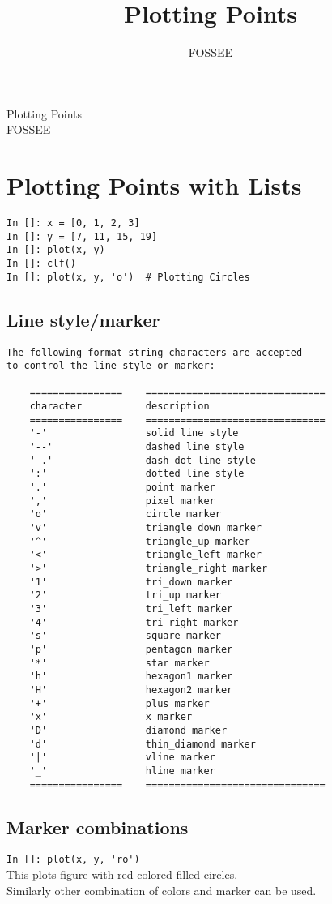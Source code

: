 \documentclass[12pt]{article}
\title{Plotting Points}
\author{FOSSEE}
\newcommand{\typ}[1]{\lstinline{#1}}
\begin{document}
\date{}
\vspace{-1in}
\begin{center}
\LARGE{Plotting Points}\\
\large{FOSSEE}
\end{center}

\section{Plotting Points with Lists}

\begin{lstlisting}
In []: x = [0, 1, 2, 3]
In []: y = [7, 11, 15, 19]
In []: plot(x, y)
In []: clf()
In []: plot(x, y, 'o')  # Plotting Circles
\end{lstlisting}

\subsection{Line style/marker}
\begin{lstlisting}
The following format string characters are accepted 
to control the line style or marker:
    
    ================    ===============================
    character           description
    ================    ===============================
    '-'                 solid line style
    '--'                dashed line style
    '-.'                dash-dot line style
    ':'                 dotted line style
    '.'                 point marker
    ','                 pixel marker
    'o'                 circle marker
    'v'                 triangle_down marker
    '^'                 triangle_up marker
    '<'                 triangle_left marker
    '>'                 triangle_right marker
    '1'                 tri_down marker
    '2'                 tri_up marker
    '3'                 tri_left marker
    '4'                 tri_right marker
    's'                 square marker
    'p'                 pentagon marker
    '*'                 star marker
    'h'                 hexagon1 marker
    'H'                 hexagon2 marker
    '+'                 plus marker
    'x'                 x marker
    'D'                 diamond marker
    'd'                 thin_diamond marker
    '|'                 vline marker
    '_'                 hline marker
    ================    ===============================

\end{lstlisting}

\subsection{Marker combinations}
\typ{In []: plot(x, y, 'ro')} \\
This plots figure with red colored filled circles.\\
Similarly other combination of colors and marker can be used.
\end{document}
